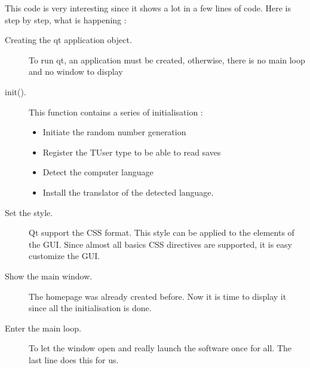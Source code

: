 This code is very interesting since it shows a lot in a few lines of code. Here is step by step, what is happening :
\begin{description}
	\item[Creating the qt application object.] To run qt, an application must be created, otherwise, there is no main loop and no window to display
	\item[init().]  This function contains a series of initialisation :
	\begin{itemize}
		\item Initiate the random number generation
		\item Register the TUser type to be able to read saves
		\item Detect the computer language
		\item Install the translator of the detected language.
	\end{itemize}
	\item[Set the style.] Qt support the CSS format. This style can be applied to the elements of the GUI. Since almost all basics CSS directives are supported, it is easy customize the GUI.
	\item[Show the main window.] The homepage was already created before. Now it is time to display it since all the initialisation is done.
	\item[Enter the main loop.] To let the window open and really launch the software once for all. The last line does this for us.
\end{description}


